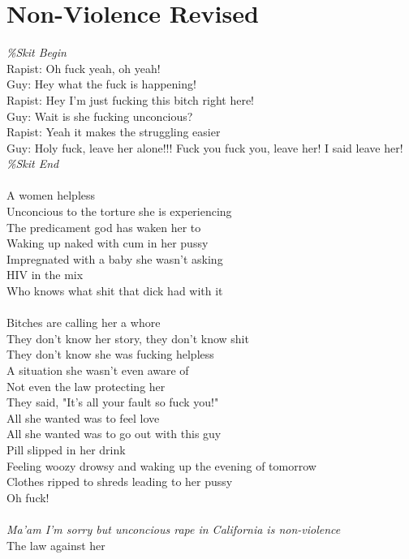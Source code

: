 \documentclass[12pt, b5paper, oneside]{book}
\begin{document}
\section{Non-Violence Revised}
\textit{\%Skit Begin}
\\Rapist: Oh fuck yeah, oh yeah!
\\Guy: Hey what the fuck is happening!
\\Rapist: Hey I'm just fucking this bitch right here!
\\Guy: Wait is she fucking unconcious? 
\\Rapist: Yeah it makes the struggling easier
\\Guy: Holy fuck, leave her alone!!! Fuck you fuck you, leave her! I said leave her!
\\\textit{\%Skit End}
%
\\\\A women helpless
\\Unconcious to the torture she is experiencing 
\\The predicament god has waken her to
\\Waking up naked with cum in her pussy
\\Impregnated with a baby she wasn't asking 
\\HIV in the mix
\\Who knows what shit that dick had with it
%
\\\\Bitches are calling her a whore 
\\They don't know her story, they don't know shit
\\They don't know she was fucking helpless
\\A situation she wasn't even aware of 
\\Not even the law protecting her 
\\They said, "It's all your fault so fuck you!"
\\All she wanted was to feel love 
\\All she wanted was to go out with this guy
\\Pill slipped in her drink
\\Feeling woozy drowsy and waking up the evening of tomorrow 
\\Clothes ripped to shreds leading to her pussy
\\Oh fuck!
%
\\\\\textit{Ma'am I'm sorry but unconcious rape in California is non-violence}
\\The law against her 
\end{document}
